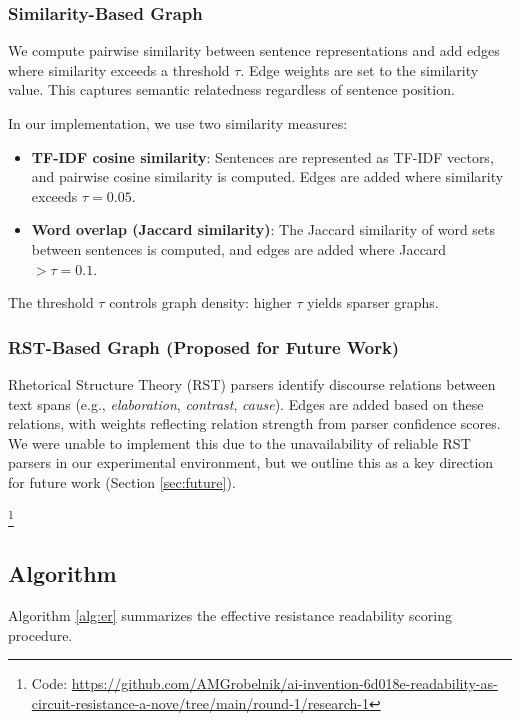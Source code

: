 \documentclass[11pt,letterpaper]{article}
\begin{document}
\subsubsection{Similarity-Based Graph}

We compute pairwise similarity between sentence representations and add edges where similarity exceeds a threshold $\tau$. Edge weights are set to the similarity value. This captures semantic relatedness regardless of sentence position. 

In our implementation, we use two similarity measures:
\begin{itemize}
    \item \textbf{TF-IDF cosine similarity}: Sentences are represented as TF-IDF vectors, and pairwise cosine similarity is computed. Edges are added where similarity exceeds $\tau = 0.05$.
    \item \textbf{Word overlap (Jaccard similarity)}: The Jaccard similarity of word sets between sentences is computed, and edges are added where Jaccard $> \tau = 0.1$.
\end{itemize}

The threshold $\tau$ controls graph density: higher $\tau$ yields sparser graphs.

\subsubsection{RST-Based Graph (Proposed for Future Work)}

Rhetorical Structure Theory (RST) parsers identify discourse relations between text spans (e.g., \textit{elaboration}, \textit{contrast}, \textit{cause}). Edges are added based on these relations, with weights reflecting relation strength from parser confidence scores. We were unable to implement this due to the unavailability of reliable RST parsers in our experimental environment, but we outline this as a key direction for future work (Section \ref{sec:future}).

\footnote{Code: \url{https://github.com/AMGrobelnik/ai-invention-6d018e-readability-as-circuit-resistance-a-nove/tree/main/round-1/research-1}}

\subsection{Algorithm}

Algorithm \ref{alg:er} summarizes the effective resistance readability scoring procedure.
\end{document}
